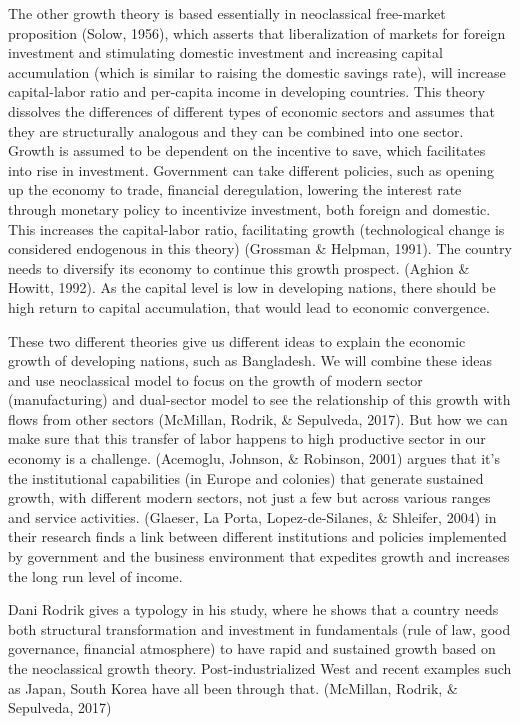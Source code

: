 \documentclass[11pt,a4paper]{article}
\begin{document}
The other growth theory is based essentially in neoclassical free-market proposition (Solow, 1956), which asserts that liberalization of markets for foreign investment and stimulating domestic investment and increasing capital accumulation (which is similar to raising the domestic savings rate), will increase capital-labor ratio and per-capita income in developing countries. This theory dissolves the differences of different types of economic sectors and assumes that they are structurally analogous and they can be combined into one sector. Growth is assumed to be dependent on the incentive to save, which facilitates into rise in investment. Government can take different policies, such as opening up the economy to trade, financial deregulation, lowering the interest rate through monetary policy to incentivize investment, both foreign and domestic. This increases the capital-labor ratio, facilitating growth (technological change is considered endogenous in this theory) (Grossman \& Helpman, 1991). The country needs to diversify its economy to continue this growth prospect. (Aghion \& Howitt, 1992). As the capital level is low in developing nations, there should be high return to capital accumulation, that would lead to economic convergence. 

These two different theories give us different ideas to explain the economic growth of developing nations, such as Bangladesh. We will combine these ideas and use neoclassical model to focus on the growth of modern sector (manufacturing) and dual-sector model to see the relationship of this growth with flows from other sectors (McMillan, Rodrik, \& Sepulveda, 2017). But how we can make sure that this transfer of labor happens to high productive sector in our economy is a challenge. (Acemoglu, Johnson, \& Robinson, 2001) argues that it’s the institutional capabilities (in Europe and colonies) that generate sustained growth, with different modern sectors, not just a few but across various ranges and service activities. (Glaeser, La Porta, Lopez-de-Silanes, \& Shleifer, 2004) in their research finds a link between different institutions and policies implemented by government and the business environment that expedites growth and increases the long run level of income. 

Dani Rodrik gives a typology in his study, where he shows that a country needs both structural transformation and investment in fundamentals (rule of law, good governance, financial atmosphere) to have rapid and sustained growth based on the neoclassical growth theory. Post-industrialized West and recent examples such as Japan, South Korea have all been through that. (McMillan, Rodrik, \& Sepulveda, 2017)
\end{document}

